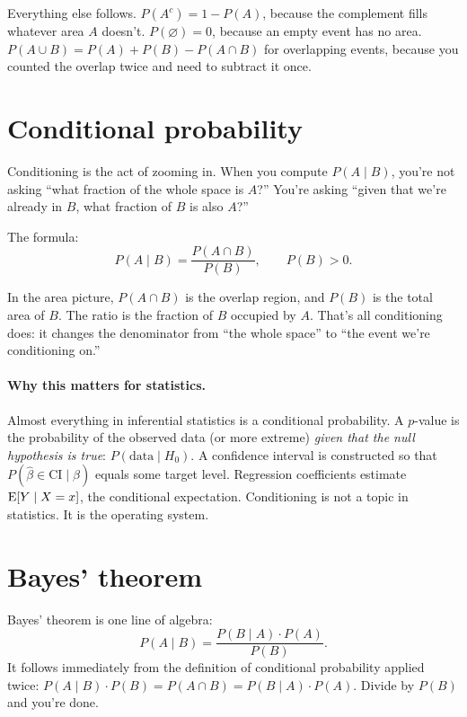 Everything else follows. $P(A^c) = 1 - P(A)$, because the complement fills whatever area $A$ doesn't. $P(\varnothing) = 0$, because an empty event has no area. $P(A \cup B) = P(A) + P(B) - P(A \cap B)$ for overlapping events, because you counted the overlap twice and need to subtract it once.

\section{Conditional probability}

Conditioning is the act of zooming in. When you compute $P(A \mid B)$, you're not asking ``what fraction of the whole space is $A$?'' You're asking ``given that we're already in $B$, what fraction of $B$ is also $A$?''

The formula:
\begin{equation}
  P(A \mid B) = \frac{P(A \cap B)}{P(B)}, \qquad P(B) > 0.
  \label{eq:cond-prob}
\end{equation}

In the area picture, $P(A \cap B)$ is the overlap region, and $P(B)$ is the total area of $B$. The ratio is the fraction of $B$ occupied by $A$. That's all conditioning does: it changes the denominator from ``the whole space'' to ``the event we're conditioning on.''

\paragraph{Why this matters for statistics.} Almost everything in inferential statistics is a conditional probability. A $p$-value is the probability of the observed data (or more extreme) \emph{given that the null hypothesis is true}: $P(\text{data} \mid H_0)$. A confidence interval is constructed so that $P(\hat\beta \in \text{CI} \mid \beta)$ equals some target level. Regression coefficients estimate $\operatorname{E}[Y \mid X = x]$, the conditional expectation. Conditioning is not a topic in statistics. It is the operating system.

\section{Bayes' theorem}

Bayes' theorem is one line of algebra:
\begin{equation}
  P(A \mid B) = \frac{P(B \mid A) \cdot P(A)}{P(B)}.
  \label{eq:bayes}
\end{equation}
It follows immediately from the definition of conditional probability applied twice: $P(A \mid B) \cdot P(B) = P(A \cap B) = P(B \mid A) \cdot P(A)$. Divide by $P(B)$ and you're done.

